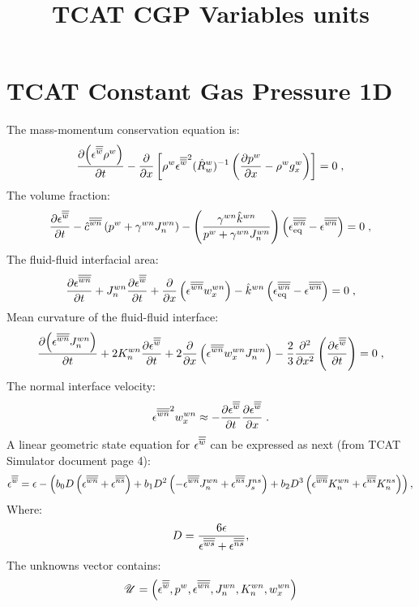 \documentclass{article}
\title{TCAT CGP Variables units}
\begin{document}
\maketitle
\section{TCAT Constant Gas Pressure 1D}
The mass-momentum conservation equation is:
\begin{equation}
\pdt{\lrp{\ew \raw}}
-\pd{}x\lrb{\raw\ew^2 (\hsR^w_w)^{-1}
\lrp{\pd\paw x-\raw g_x^w}}
=0
\;,
\label{eq:TpMP1d}
\end{equation}
The volume fraction:
\begin{equation}
\pdt{\ew}
-\dbs{\hat c}\wn\lrp{\paw+\iftma\wn J_n^\wn}
-\lrp{\frac{\iftma\wn\hsk^\wn}{\paw+\iftma\wn J_n^\wn}}
  \lrp{\sdats\gke\wn{\rm{eq}}-\ewn}
=0\;,
\label{eq:swev}
\end{equation}
The fluid-fluid interfacial area: 
\begin{equation}
 \pdt\ewn
+J_n^\wn\pdt{\ew}
+\pd{}x\lrp{\ewn w_x^\wn} 
-\hsk^\wn\lrp{\sdats\gke\wn{\rm{eq}}-\ewn}
=0\;,
\label{eq:ewnev1d}
\end{equation}
Mean curvature of the fluid-fluid interface:
\begin{equation}
\pdt {\lrp{\ewn J_n^\wn}}
+2K_n^\wn \pdt\ew
+2\pd{}x\lrp{\ewn w_x^\wn J_n^\wn}
-\frac 23\pdn 2{}x\lrp{\pdt\ew}
=0\;,
\label{eq:TpJ1d}
\end{equation}
The normal interface velocity:
\begin{equation}
\ewn^2 w_x^\wn\approx
-\pdt\ew\pd \ew x\;.
\label{eq:Tp-w1d}
\end{equation}
A linear geometric state equation for \(\ew\) can be expressed as next (from TCAT Simulator document page 4):
\begin{equation}
\ew=\gke-\lrp{b_0{D}\lrp{\ewn+\ens}+b_1{D^2}\lrp{-\ewn{J_n^\wn}+\ens{J_s^\ns}}+{b_2} {D^3}\lrp{\ewn{K_n^\wn}+\ens{K_n^\ns}}},
\label{eq:Tp-igeos-linear}
\end{equation}
Where:
\begin{equation}
D=\frac{6\gke}{\ews+\ens},
\label{eq:Tp-igeos-linear-D}
\end{equation}
The unknowns vector contains:
\begin{equation}
\set U = \lrp{\ew, \paw, \ewn, J_n^\wn, K_n^\wn, w_x^\wn} 
\label{eq:U_simplified}
\end{equation}
\pagebreak
\end{document}
